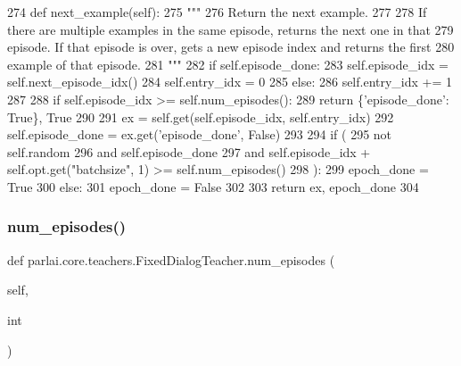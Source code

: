 \begin{DoxyCode}
274     \textcolor{keyword}{def }next\_example(self):
275         \textcolor{stringliteral}{"""}
276 \textcolor{stringliteral}{        Return the next example.}
277 \textcolor{stringliteral}{}
278 \textcolor{stringliteral}{        If there are multiple examples in the same episode, returns the next one in that}
279 \textcolor{stringliteral}{        episode. If that episode is over, gets a new episode index and returns the first}
280 \textcolor{stringliteral}{        example of that episode.}
281 \textcolor{stringliteral}{        """}
282         \textcolor{keywordflow}{if} self.episode\_done:
283             self.episode\_idx = self.next\_episode\_idx()
284             self.entry\_idx = 0
285         \textcolor{keywordflow}{else}:
286             self.entry\_idx += 1
287 
288         \textcolor{keywordflow}{if} self.episode\_idx >= self.num\_episodes():
289             \textcolor{keywordflow}{return} \{\textcolor{stringliteral}{'episode\_done'}: \textcolor{keyword}{True}\}, \textcolor{keyword}{True}
290 
291         ex = self.get(self.episode\_idx, self.entry\_idx)
292         self.episode\_done = ex.get(\textcolor{stringliteral}{'episode\_done'}, \textcolor{keyword}{False})
293 
294         \textcolor{keywordflow}{if} (
295             \textcolor{keywordflow}{not} self.random
296             \textcolor{keywordflow}{and} self.episode\_done
297             \textcolor{keywordflow}{and} self.episode\_idx + self.opt.get(\textcolor{stringliteral}{"batchsize"}, 1) >= self.num\_episodes()
298         ):
299             epoch\_done = \textcolor{keyword}{True}
300         \textcolor{keywordflow}{else}:
301             epoch\_done = \textcolor{keyword}{False}
302 
303         \textcolor{keywordflow}{return} ex, epoch\_done
304 
\end{DoxyCode}
\mbox{\label{classparlai_1_1core_1_1teachers_1_1FixedDialogTeacher_a51e3463e7b7b44a6ea8b43fc82aacb75}} 
\subsubsection{\texorpdfstring{num\+\_\+episodes()}{num\_episodes()}}
{\footnotesize\ttfamily def parlai.\+core.\+teachers.\+Fixed\+Dialog\+Teacher.\+num\+\_\+episodes (\begin{DoxyParamCaption}\item[{}]{self,  }\item[{}]{int }\end{DoxyParamCaption})}

